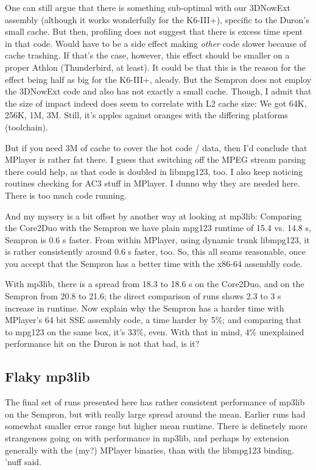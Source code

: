 \documentclass[a4paper,12pt]{scrartcl}
\begin{document}
One can still argue that there is something sub-optimal with our 3DNowExt assembly (although it works wonderfully for the K6-III+), specific to the Duron's small cache. But then, profiling does not suggest that there is excess time spent in that code. Would have to be a side effect making {\em other} code slower because of cache trashing.
If that's the case, however, this effect should be smaller on a proper Athlon (Thunderbird, at least).
It could be that this is the reason for the effect being half as big for the K6-III+, aleady. But the Sempron does not employ the 3DNowExt code and also has not exactly a small cache. Though, I admit that the size of impact indeed does seem to correlate with L2 cache size: We got 64K, 256K, 1M, 3M.
Still, it's apples against oranges with the differing platforms (toolchain).

But if you need 3M of cache to cover the hot code / data, then I'd conclude that MPlayer is rather fat there. I guess that switching off the MPEG stream parsing there could help, as that code is doubled in libmpg123, too.
I also keep noticing routines checking for AC3 stuff in MPlayer. I dunno why they are needed here. There is too much code running.

And my mysery is a bit offset by another way at looking at mp3lib: Comparing the Core2Duo with the Sempron we have plain mpg123 runtime of 15.4 vs. 14.8 s, Sempron is 0.6 s faster. From within MPlayer, using dynamic trunk libmpg123, it is rather consistently around 0.6 s faster, too.
So, this all seams reasonable, once you accept that the Sempron has a better time with the x86-64 assemblly code.

With mp3lib, there is a spread from 18.3 to 18.6 s on the Core2Duo, and on the Sempron from 20.8 to 21.6; the direct comparison of runs shows 2.3 to 3 s increase in runtime. Now explain why the Sempron has a harder time with MPlayer's 64 bit SSE assembly code, a time harder by 5\%; and comparing that to mpg123 on the same box, it's 33\%, even.
With that in mind, 4\% unexplained performance hit on the Duron is not that bad, is it?

\subsection{Flaky mp3lib}

The final set of runs presented here has rather consistent performance of mp3lib on the Sempron, but with really large spread around the mean. Earlier runs had somewhat smaller error range but higher mean runtime.
There is definetely more strangeness going on with performance in mp3lib, and perhaps by extension generally with the (my?) MPlayer binaries, than with the libmpg123 binding. 'nuff said.
\end{document}
